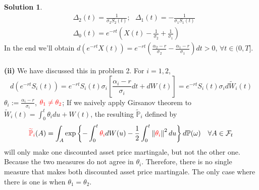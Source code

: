 \documentclass[a4paper, 10pt]{article}
\theoremstyle{definition}
\theoremstyle{hSol}
\newtheorem*{solution}{Solution}
\begin{document}
\begin{solution}
\begin{equation}
\begin{split}
		&\Delta_2(t) = \frac{1}{\sigma_2S_2(t)};~~~\Delta_1(t) = -\frac{1}{\sigma_1S_1(t)} \\
		&\Delta_0(t) = e^{-rt}\left(X(t)-\frac{1}{\sigma_2}+\frac{1}{\sigma_1}\right)
	\end{split}
\end{equation}
In the end we'll obtain $d(e^{-rt}X(t))=e^{-rt}\left(\frac{\alpha_2 - r}{\sigma_2}-\frac{\alpha_1 - r}{\sigma_1}\right)dt > 0$, $\forall t\in (0,T]$.\\
~\\
\textbf{(ii)} We have discussed this in problem 2. For $i=1,2$, 
$$
d(e^{-rt} S_i(t)) = e^{-rt}S_i(t)\sigma_i\left[\frac{\alpha_i - r}{\sigma_i}dt + dW(t)\right] = e^{-rt}S_i(t)\sigma_i  d\widetilde{W}_i(t)
$$
$\theta_i:=\frac{\alpha_i - r}{\sigma_i}$, $\textcolor{red}{\theta_1\ne \theta_2}$; If we naively apply Girsanov theorem to $\widetilde{W}_i(t) = \int_0^t \theta_i du + W(t)$, the resulting $\widetilde{\mathbb{P}}_i$ defined by
$$
\textcolor{red}{\widetilde{\mathbb{P}}_i}(A) = \int_A \exp\left\{-\int_0^t \textcolor{red}{\theta_i} dW(u)-\frac{1}{2}\int_0^t \left\lVert \textcolor{red}{\theta_i} \right\rVert^2 du \right\} d \mathbb{P}(\omega)~~~\forall A \in \mathcal{F}_t
$$
will only make one discounted asset price martingale, but not the other one. Because the two measures do not agree in $\theta_i$. Therefore, there is no single measure that makes both discounted asset price martingale. The only case where there is one is when $\theta_1 = \theta_2$.
\end{solution}
\end{document}
